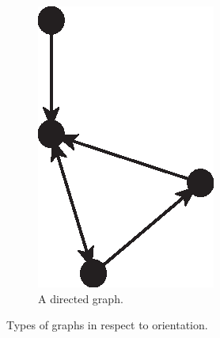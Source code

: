 \begin{figure}[H]
\begin{subfigure}[b]{0.27\textwidth}
            \label{fig:graphs_orientation_undirected}
          \end{subfigure}
          \qquad\qquad\qquad
          \begin{subfigure}[b]{0.27\textwidth}
            \includegraphics[width=\textwidth]{chapters/02_problem_definition/graph_directed}
            \caption{A directed graph.}
            \label{fig:graphs_orientation_directed}
          \end{subfigure}
        \caption{Types of graphs in respect to orientation.}
        \label{fig:graphs_orientation}
      \end{figure}
      
